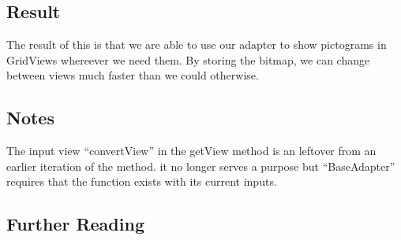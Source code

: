 \subsection{Result}
The result of this is that we are able to use our adapter to show pictograms in GridViews whereever we need them.
By storing the bitmap, we can change between views much faster than we could otherwise.


\subsection{Notes}
The input view ``convertView'' in the getView method is an leftover from an earlier iteration of the method. it no longer serves a purpose but ``BaseAdapter'' requires that the function exists with its current inputs.\\

\subsection{Further Reading}
